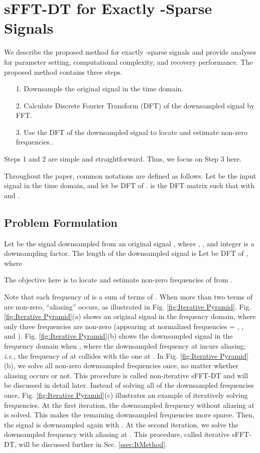 \documentclass[journal,onecolumn,11pt]{IEEEtran}
\begin{document}
\section{sFFT-DT for Exactly -Sparse Signals}\label{Sec: sFFT-DT: Exact K-Sparse}
We describe the proposed method for exactly -sparse signals and provide analyses for parameter setting, computational complexity, and recovery performance.
The proposed method contains three steps.
\begin{itemize}
  \item[1.] Downsample the original signal in the time domain.
  \item[2.] Calculate Discrete Fourier Transform (DFT) of the downsampled signal by FFT.
  \item[3.] Use the DFT of the downsampled signal to locate and estimate  non-zero frequencies..
\end{itemize}
Steps 1 and 2 are simple and straightforward.
Thus, we focus on Step 3 here.

Throughout the paper, common notations are defined as follows.
Let  be the input signal in the time domain, and let  be DFT of .
 is the DFT matrix such that  with  and .

\subsection{Problem Formulation}\label{ssec:DFT Property}
Let  be the signal downsampled from an original signal , where , , and integer   is a downsampling factor.
The length of the downsampled signal  is 
Let  be DFT of , where
\small

\normalsize
The objective here is to locate and estimate  non-zero frequencies of  from .

Note that each frequency of  is a sum of  terms of .
When more than two terms of  are non-zero, ``aliasing'' occurs, as illustrated in Fig. \ref{fig:Iterative Pyramid}.
Fig. \ref{fig:Iterative Pyramid}(a) shows an original signal in the frequency domain, where only three frequencies are non-zero (appearing at normalized frequencies = , , and ).
Fig. \ref{fig:Iterative Pyramid}(b) shows the downsampled signal in the frequency domain when , where the downsampled frequency at  incurs aliasing; {\em i.e.}, the frequency of  at  collides with the one at .
In Fig. \ref{fig:Iterative Pyramid}(b), we solve all non-zero downsampled frequencies once, no matter whether aliasing occurs or not.
This procedure is called non-iterative sFFT-DT and will be discussed in detail later.
Instead of solving all of the downsampled frequencies once, Fig. \ref{fig:Iterative Pyramid}(c) illustrates an example of iteratively solving frequencies.
At the first iteration, the downsampled frequency without aliasing at  is solved.
This makes the remaining downsampled frequencies more sparse.
Then, the signal is downsampled again with .
At the second iteration, we solve the downsampled frequency with aliasing at .
This procedure, called iterative sFFT-DT, will be discussed further in Sec. \ref{ssec:ItMethod}.
\end{document}
